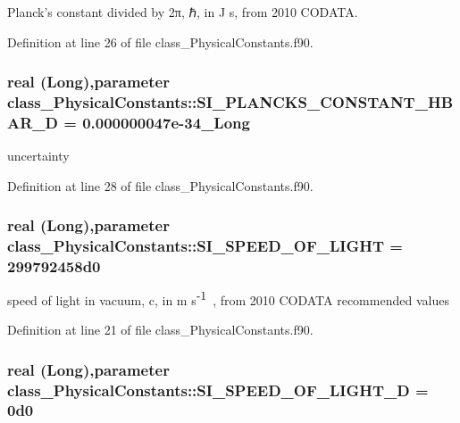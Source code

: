 Planck's constant divided by 2π, ℏ, in J s, from 2010 CODATA. 



Definition at line 26 of file class\_\-PhysicalConstants.f90.

\hypertarget{namespaceclass__PhysicalConstants_a3d0c994c98a42bfcf113f5b427c36962}{
\subsubsection[{SI\_\-PLANCKS\_\-CONSTANT\_\-HBAR\_\-D}]{\setlength{\rightskip}{0pt plus 5cm}real (Long),parameter {\bf class\_\-PhysicalConstants::SI\_\-PLANCKS\_\-CONSTANT\_\-HBAR\_\-D} = 0.000000047e-\/34\_\-Long}}
\label{namespaceclass__PhysicalConstants_a3d0c994c98a42bfcf113f5b427c36962}


uncertainty 



Definition at line 28 of file class\_\-PhysicalConstants.f90.

\hypertarget{namespaceclass__PhysicalConstants_a30ec603cc75f0d29a1429faabdce848c}{
\subsubsection[{SI\_\-SPEED\_\-OF\_\-LIGHT}]{\setlength{\rightskip}{0pt plus 5cm}real (Long),parameter {\bf class\_\-PhysicalConstants::SI\_\-SPEED\_\-OF\_\-LIGHT} = 299792458d0}}
\label{namespaceclass__PhysicalConstants_a30ec603cc75f0d29a1429faabdce848c}


speed of light in vacuum, c, in m s$^{\mbox{-\/1}}$ , from 2010 CODATA recommended values 



Definition at line 21 of file class\_\-PhysicalConstants.f90.

\hypertarget{namespaceclass__PhysicalConstants_aa56bb92d92839b2fef368f7be3640777}{
\subsubsection[{SI\_\-SPEED\_\-OF\_\-LIGHT\_\-D}]{\setlength{\rightskip}{0pt plus 5cm}real (Long),parameter {\bf class\_\-PhysicalConstants::SI\_\-SPEED\_\-OF\_\-LIGHT\_\-D} = 0d0}}
\label{namespaceclass__PhysicalConstants_aa56bb92d92839b2fef368f7be3640777}


